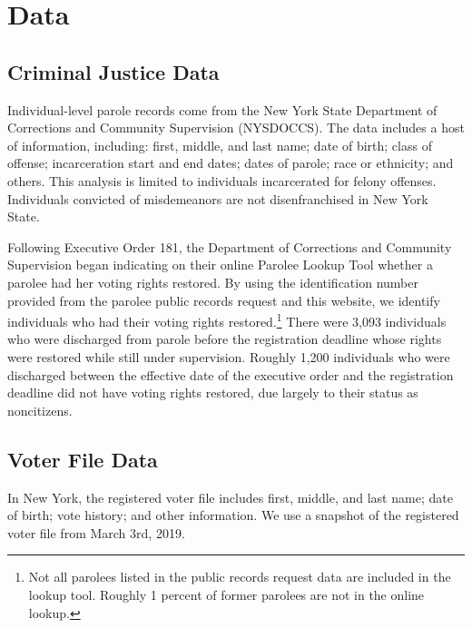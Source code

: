 \documentclass[
  12pt,
]{article}
\begin{document}
\hypertarget{data}{%
\section*{Data}\label{data}}

\hypertarget{criminal-justice-data}{%
\subsection*{Criminal Justice Data}\label{criminal-justice-data}}

Individual-level parole records come from the New York State Department of Corrections and Community Supervision (NYSDOCCS). The data includes a host of information, including: first, middle, and last name; date of birth; class of offense; incarceration start and end dates; dates of parole; race or ethnicity; and others. This analysis is limited to individuals incarcerated for felony offenses. Individuals convicted of misdemeanors are not disenfranchised in New York State.

Following Executive Order 181, the Department of Corrections and Community Supervision began indicating on their online Parolee Lookup Tool whether a parolee had her voting rights restored. By using the identification number provided from the parolee public records request and this website, we identify individuals who had their voting rights restored.\footnote{Not all parolees listed in the public records request data are included in the lookup tool. Roughly 1 percent of former parolees are not in the online lookup.} There were 3,093 individuals who were discharged from parole before the registration deadline whose rights were restored while still under supervision. Roughly 1,200 individuals who were discharged between the effective date of the executive order and the registration deadline did not have voting rights restored, due largely to their status as noncitizens.

\hypertarget{voter-file-data}{%
\subsection*{Voter File Data}\label{voter-file-data}}

In New York, the registered voter file includes first, middle, and last name; date of birth; vote history; and other information. We use a snapshot of the registered voter file from March 3rd, 2019.
\end{document}
